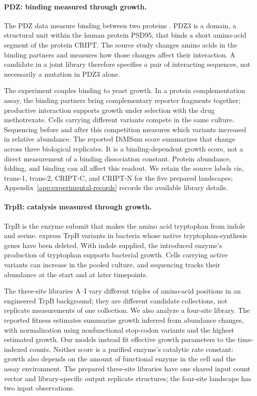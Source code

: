 \documentclass[11pt]{article}
\begin{document}
\paragraph{PDZ: binding measured through growth.}
The PDZ data measure binding between two proteins \citep{zarin2024}.
PDZ3 is a domain, a structural unit
within the human protein PSD95, that binds a short amino-acid segment of
the protein CRIPT. The source study changes amino acids in the binding
partners and measures how those changes affect their interaction. A candidate
in a joint library therefore specifies a pair of interacting sequences,
not necessarily a mutation in PDZ3 alone.

The experiment couples binding to yeast growth. In a
protein complementation assay, the binding partners bring complementary
reporter fragments together; productive interaction supports growth under
selection with the drug methotrexate. Cells carrying different variants compete
in the same culture. Sequencing before and after this competition measures
which variants increased in relative abundance. The reported DiMSum score
summarizes that change across three biological replicates. It is a
binding-dependent growth score, not a direct measurement of a binding
dissociation constant. Protein abundance, folding, and binding can all
affect this readout. We retain the source labels cis,
trans-1, trans-2, CRIPT-C, and CRIPT-N for the five prepared landscapes;
Appendix~\ref{app:experimental-records} records the available library details.

\paragraph{TrpB: catalysis measured through growth.}
TrpB is the enzyme subunit that makes the amino acid tryptophan from indole
and serine. \citet{johnston2024} express TrpB variants in bacteria whose
native tryptophan-synthesis genes have been deleted. With indole supplied,
the introduced enzyme's production of tryptophan supports bacterial growth.
Cells carrying active variants can increase in the pooled culture, and
sequencing tracks their abundance at the start and at later timepoints.

The three-site libraries A--I vary different triples of amino-acid positions
in an engineered TrpB background; they are different candidate collections,
not replicate measurements of one collection. We also analyze a four-site
library. The reported fitness estimates summarize growth inferred from
abundance changes, with normalization using nonfunctional stop-codon variants
and the highest estimated growth. Our models instead fit effective growth
parameters to the time-indexed counts. Neither score is a purified enzyme's
catalytic rate constant: growth also depends on the amount of functional
enzyme in the cell and the assay environment. The prepared three-site
libraries have one shared input count vector and library-specific output
replicate structures; the four-site landscape has two input observations.
\end{document}
